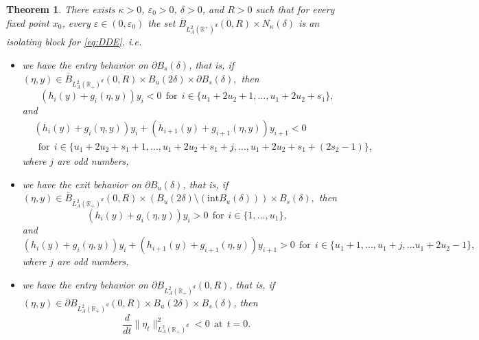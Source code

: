 \documentclass[11pt, leqno]{amsart}
\newtheorem{thm}{Theorem}[section]
\theoremstyle{definition}
\def\R{\mathbb{R}}
\begin{document}
\begin{thm}\label{thm:isol}
There exists $\kappa>0$, $\varepsilon_0 >0$, $\delta>0$, and $R>0$ such that for every  fixed point $x_0$, every $\varepsilon\in (0,\varepsilon_0)$ the set $\overline{B}_{L^2_A(\R^+)^d}(0,R)\times N_\kappa(\delta)$ is an isolating block for \eqref{eq:DDE}, i.e.
\begin{itemize}
	\item[(I)] we have the entry behavior on $\partial B_s(\delta)$, that is, if
	$(\eta,y)\in  \overline{B}_{L^2_A(\mathbb{R}_+)^d}(0,R) \times B_u(2\delta) \times \partial B_s(\delta),$
	then
	\begin{equation}\label{eq:1is_e}
		(h_i(y)+g_i(\eta,y)) y_i < 0 \ \ \textrm{for} \ \ i\in \{u_1+2u_2+1,\ldots, u_1+2u_2+s_1\},
	\end{equation}
	and
	\begin{align}\label{eq:2is_e}
		& (h_i(y)+g_i(\eta,y)) y_i + (h_{i+1}(y)+g_{i+1}(\eta,y))y_{i+1}< 0 \\
		&\nonumber \ \ \textrm{for} \ \ i\in \{u_1+2u_2+s_1+1,\ldots,u_1+2u_2+s_1+j,\ldots, u_1+2u_2+s_1+(2s_2-1)\},
	\end{align}
	where $j$ are odd numbers,
	\item[(II)] we have the exit behavior on $\partial B_u(\delta)$, that is, if
	$(\eta,y)\in  \overline{B}_{L^2_A(\mathbb{R}_+)^d}(0,R)\times \left(B_u(2\delta) \setminus (\textrm{int} B_u(\delta))\right) \times B_s(\delta),$
	then
	\begin{equation}\label{eq:3is_e}
		(h_i(y)+g_i(\eta,y))y_i > 0 \ \ \textrm{for} \ \ i\in \{1,\ldots, u_1\},
	\end{equation}
	and
	\begin{equation}\label{eq:4is_e}
		(h_i(y)+g_i(\eta,y)) y_i + (h_{i+1}(y)+g_{i+1}(\eta,y))y_{i+1}> 0 \ \ \textrm{for} \ \ i\in \{ u_1+1,\ldots,u_1+j,\ldots u_1+2u_2-1\},
	\end{equation}
	where $j$ are odd numbers,
	\item[(III)] we have the entry behavior on $\partial B_{L^2_A(\mathbb{R}_+)^d}(0,R)$, that is, if $(\eta,y) \in  \partial B_{L^2_A(\mathbb{R}_+)^d}(0,R) \times B_u(2\delta)\times B_s(\delta) $, then
	$$
	\frac{d}{dt}\|\eta_t\|^2_{L^2_A(\mathbb{R}_+)^d} < 0 \ \ \textrm{at}\ \ t=0. \,
	$$
\end{itemize}
\end{thm}
\end{document}
